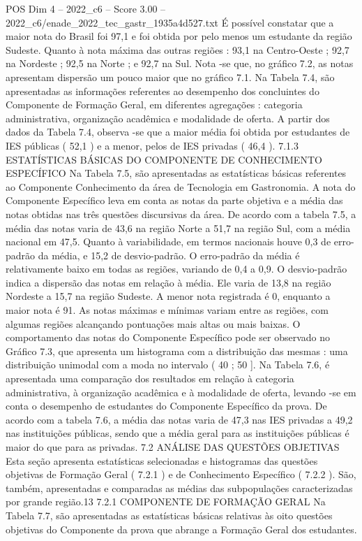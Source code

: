 \begin{textsample}{POS Dim 4 – 2022\_c6 – Score 3.00 – 2022\_c6/enade\_2022\_tec\_gastr\_1935a4d527.txt}
É possível constatar que a maior nota do Brasil foi 97,1 e foi obtida por pelo menos um estudante da região Sudeste.
Quanto à nota máxima das outras regiões : 93,1 na Centro-Oeste ; 92,7 na Nordeste ; 92,5 na Norte ; e 92,7 na Sul.
Nota -se que, no gráfico 7.2, as notas apresentam dispersão um pouco maior que no gráfico 7.1.
Na Tabela 7.4, são apresentadas as informações referentes ao desempenho dos concluintes do Componente de Formação Geral, em diferentes agregações : categoria administrativa, organização acadêmica e modalidade de oferta.
A partir dos dados da Tabela 7.4, observa -se que a maior média foi obtida por estudantes de IES públicas ( 52,1 ) e a menor, pelos de IES privadas ( 46,4 ). 7.1.3 ESTATÍSTICAS BÁSICAS DO COMPONENTE DE CONHECIMENTO ESPECÍFICO Na Tabela 7.5, são apresentadas as estatísticas básicas referentes ao Componente Conhecimento da área de Tecnologia em Gastronomia.
A nota do Componente Específico leva em conta as notas da parte objetiva e a média das notas obtidas nas três questões discursivas da área.
De acordo com a tabela 7.5, a média das notas varia de 43,6 na região Norte a 51,7 na região Sul, com a média nacional em 47,5.
Quanto à variabilidade, em termos nacionais houve 0,3 de erro-padrão da média, e 15,2 de desvio-padrão.
O erro-padrão da média é relativamente baixo em todas as regiões, variando de 0,4 a 0,9.
O desvio-padrão indica a dispersão das notas em relação à média.
Ele varia de 13,8 na região Nordeste a 15,7 na região Sudeste.
A menor nota registrada é 0, enquanto a maior nota é 91.
As notas máximas e mínimas variam entre as regiões, com algumas regiões alcançando pontuações mais altas ou mais baixas.
O comportamento das notas do Componente Específico pode ser observado no Gráfico 7.3, que apresenta um histograma com a distribuição das mesmas : uma distribuição unimodal com a moda no intervalo ( 40 ; 50 ].
Na Tabela 7.6, é apresentada uma comparação dos resultados em relação à categoria administrativa, à organização acadêmica e à modalidade de oferta, levando -se em conta o desempenho de estudantes do Componente Específico da prova.
De acordo com a tabela 7.6, a média das notas varia de 47,3 nas IES privadas a 49,2 nas instituições públicas, sendo que a média geral para as instituições públicas é maior do que para as privadas. 7.2 ANÁLISE DAS QUESTÕES OBJETIVAS Esta seção apresenta estatísticas selecionadas e histogramas das questões objetivas de Formação Geral ( 7.2.1 ) e de Conhecimento Específico ( 7.2.2 ).
São, também, apresentadas e comparadas as médias das subpopulações caracterizadas por grande região.13 7.2.1 COMPONENTE DE FORMAÇÃO GERAL Na Tabela 7.7, são apresentadas as estatísticas básicas relativas às oito questões objetivas do Componente da prova que abrange a Formação Geral dos estudantes.

\end{textsample}

